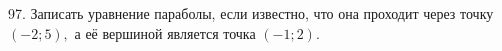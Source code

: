 97. Записать уравнение параболы, если известно, что она проходит через точку $(-2;5),$ а её вершиной является точка $(-1;2).$\\
